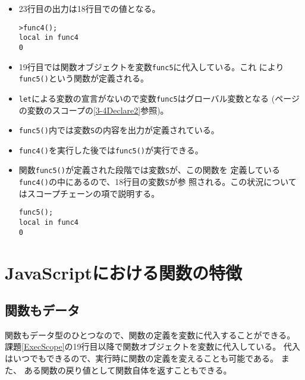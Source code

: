 \begin{itemize}
\begin{itemize}
 \item 23行目の出力は18行目での値となる。
\begin{Verbatim}
>func4();
local in func4
0
\end{Verbatim}
 \item 19行目では関数オブジェクトを変数\Verb+func5+に代入している。これ
       により\Verb+func5()+という関数が定義される。
 \item \Verb+let+による変数の宣言がないので変数\Verb+func5+はグローバル変数となる
       (\pageref{3-4Declare2}ページの変数のスコープの\ref{3-4Declare2}参照)。
 \item \Verb+func5()+内では変数\Verb+S+の内容を出力が定義されている。
 \item \Verb+func4()+を実行した後では\Verb+func5()+が実行できる。
 \item 関数\Verb+func5()+が定義された段階では変数\Verb+S+が、この関数を
       定義している\Verb+func4()+の中にあるので、18行目の変数\Verb+S+が参
       照される。この状況についてはスコープチェーンの項で説明する。
\begin{Verbatim}
func5();
local in func4
0
\end{Verbatim}
\end{itemize}
\end{itemize}

\section{JavaScriptにおける関数の特徴}
\subsection{関数もデータ}
関数もデータ型のひとつなので、関数の定義を変数に代入することができる。
課題\ref{ExecScope}の19行目以降で関数オブジェクトを変数に代入している。
代入はいつでもできるので、実行時に関数の定義を変えることも可能である。
また、%
ある関数の戻り値として関数自体を返すこともできる。
\iffalse
この使用法の例としてはある処理がブラウザごとに異なる作業を必要とするとき
に、それに適応した判定を1回だけしてあとは戻した関数を実行するだけにする
ことができる。%
\fi
